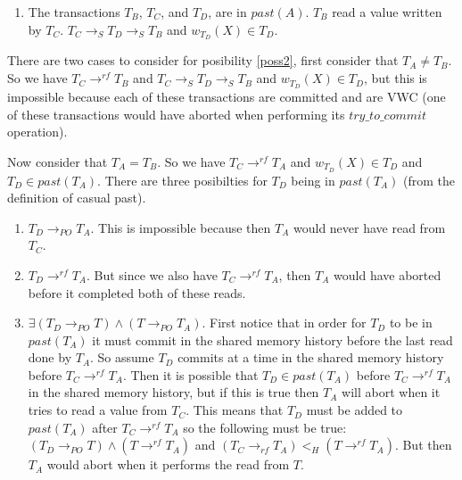 \documentclass[11pt]{article}
\begin{document}
\begin{proofT}
\begin{enumerate}
\item \label{poss2} The transactions $T_B$, $T_C$, and $T_D$, are in $past(A)$.
$T_B$ read a value written by $T_C$.
$T_C \rightarrow_S T_D \rightarrow_S T_B$ and $w_{T_D}(X) \in T_D$.

\end{enumerate}

There are two cases to consider for posibility \ref{poss2}, first consider that $T_A \neq T_B$.
So we have $T_C \rightarrow^{rf} T_B$ and $T_C \rightarrow_S T_D \rightarrow_S T_B$ and $w_{T_D}(X) \in T_D$, but this is impossible because each of these transactions are committed and are VWC (one of these transactions would have aborted when performing its $try\_to\_commit$ operation).

Now consider that $T_A = T_B$.
So we have $T_C \rightarrow^{rf} T_A$ and $w_{T_D}(X) \in T_D$ and $T_D \in past(T_A)$.
There are three posibilties for $T_D$ being in $past(T_A)$ (from the definition of casual past).

\begin{enumerate}

\item \label{pas1} $T_D \rightarrow_{PO} T_A$.  This is impossible because then $T_A$ would never have read from $T_C$.

\item \label{pas2} $T_D \rightarrow^{rf} T_A$.  But since we also have $T_C \rightarrow^{rf} T_A$, then $T_A$ would have aborted before it completed both of these reads.

\item \label{pas3} $\exists (T_D \rightarrow_{PO} T) \wedge (T \rightarrow_{PO} T_A)$.
First notice that in order for $T_D$ to be in $past(T_A)$ it must commit in the shared memory history before the last read done by $T_A$.
So assume $T_D$ commits at a time in the shared memory history before $T_C \rightarrow^{rf} T_A$.
Then it is possible that $T_D \in past(T_A)$ before $T_C \rightarrow^{rf} T_A$ in the shared memory history, but if this is true then $T_A$ will abort when it tries to read a value from $T_C$.
This means that $T_D$ must be added to $past(T_A)$ after $T_C \rightarrow^{rf} T_A$ so the following must be true:
$(T_D \rightarrow_{PO} T) \wedge (T \rightarrow^{rf} T_A)$ and $(T_C \rightarrow_{rf} T_A) <_H  (T \rightarrow^{rf} T_A)$.
But then $T_A$ would abort when it performs the read from $T$.

\end{enumerate}

\renewcommand{\toto}{vwcinvisperm} 
\end{proofT}
\end{document}
